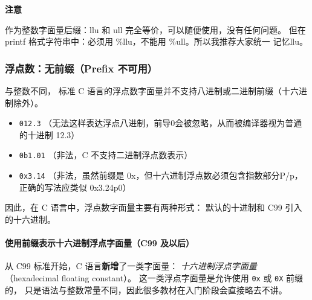 \vspace{1em}
\noindent\textbf{注意}

作为整数字面量后缀：llu 和 ull 完全等价，可以随便使用，没有任何问题。
但在 printf 格式字符串中：必须用 \%llu，不能用 \%ull。所以我推荐大家统一
记忆llu。

\newpage



\subsubsection{浮点数：无前缀（Prefix 不可用）}%

与整数不同，
标准 C 语言的浮点数字面量并不支持八进制或二进制前缀（十六进制除外）。

\begin{itemize}
    \item \verb|012.3|  （无法这样表达浮点八进制，前导0会被忽略，从而被编译器视为普通的十进制 12.3）
    \item \verb|0b1.01| （非法，C 不支持二进制浮点数表示）
    \item \verb|0x3.14| （非法，虽然前缀是 0x，但十六进制浮点数必须包含指数部分P/p，正确的写法应类似 0x3.24p0）
\end{itemize}



因此，在 C 语言中，浮点数字面量主要有两种形式：
默认的十进制和 C99 引入的十六进制。


\paragraph{使用前缀表示十六进制浮点字面量（C99 及以后）}


从 C99 标准开始，C 语言\textbf{新增}了一类字面量：
\emph{十六进制浮点字面量}（hexadecimal floating constant）。  
这一类浮点字面量是允许使用 \verb|0x| 或 \verb|0X| 前缀的，
只是语法与整数常量不同，因此很多教材在入门阶段会直接略去不讲。

\vspace{1em}





